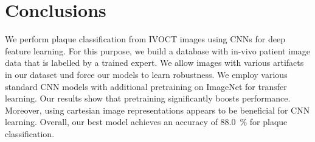 \section{Conclusions}

We perform plaque classification from IVOCT images using CNNs for deep feature learning. For this purpose, we build a database with in-vivo patient image data that is labelled by a trained expert. We allow images with various artifacts in our dataset und force our models to learn robustness. We employ various standard CNN models with additional pretraining on ImageNet for transfer learning. Our results show that pretraining significantly boosts performance. Moreover, using cartesian image representations appears to be beneficial for CNN learning. Overall, our best model achieves an accuracy of \SI{88.0}{\percent} for plaque classification.


 





